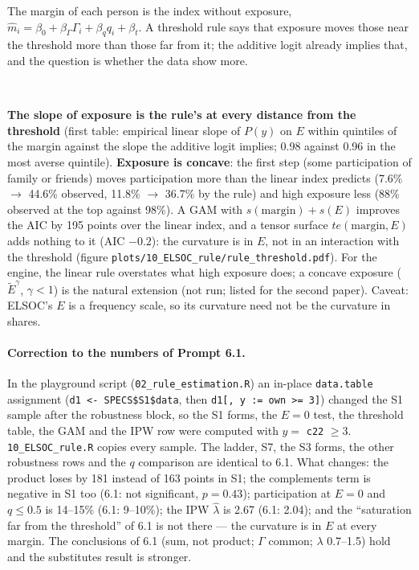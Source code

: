\documentclass[11pt,a4paper]{article}
\newcommand{\Ee}{\tilde{E}}                 %
\newcommand{\code}[1]{\texttt{#1}}
\begin{document}
The margin of each person is the index without exposure, $\hat m_i = \beta_0 + \beta_\Gamma\Gamma_i +
\beta_q q_i + \beta_t$. A threshold rule says that exposure moves those near the threshold more than those
far from it; the additive logit already implies that, and the question is whether the data show more.
\begin{center}
\footnotesize
\\[6pt]

\end{center}
\noindent \textbf{The slope of exposure is the rule's at every distance from the threshold} (first table:
empirical linear slope of $P(y)$ on $E$ within quintiles of the margin against the slope the additive logit
implies; 0.98 against 0.96 in the most averse quintile). \textbf{Exposure is concave}: the first step (some
participation of family or friends) moves participation more than the linear index predicts (7.6\% $\to$
44.6\% observed, 11.8\% $\to$ 36.7\% by the rule) and high exposure less (88\% observed at the top against
98\%). A GAM with $s(\text{margin}) + s(E)$ improves the AIC by 195 points over the linear index, and a
tensor surface $te(\text{margin}, E)$ adds nothing to it (AIC $-0.2$): the curvature is in $E$, not in an
interaction with the threshold (figure \code{plots/10\_ELSOC\_rule/rule\_threshold.pdf}). For the engine,
the linear rule overstates what high exposure does; a concave exposure ($\Ee^{\gamma}$, $\gamma < 1$) is the
natural extension (not run; listed for the second paper). Caveat: ELSOC's $E$ is a frequency scale, so its
curvature need not be the curvature in shares.

\paragraph{Correction to the numbers of Prompt 6.1.} In the playground script
(\code{02\_rule\_estimation.R}) an in-place \code{data.table} assignment
(\code{d1 <- SPECS\$S1\$data}, then \code{d1[, y := own >= 3]}) changed the S1 sample after the robustness block, so the
S1 forms, the $E = 0$ test, the threshold table, the GAM and the IPW row were computed with
$y = $ \code{c22} $\ge 3$. \code{10\_ELSOC\_rule.R} copies every sample. The ladder, S7, the S3 forms, the
other robustness rows and the $q$ comparison are identical to 6.1. What changes: the product loses by 181
instead of 163 points in S1; the complements term is negative in S1 too (6.1: not significant, $p = 0.43$);
participation at $E = 0$ and $q \le 0.5$ is 14--15\% (6.1: 9--10\%); the IPW $\hat\lambda$ is 2.67 (6.1:
2.04); and the ``saturation far from the threshold'' of 6.1 is not there --- the curvature is in $E$ at every
margin. The conclusions of 6.1 (sum, not product; $\Gamma$ common; $\lambda$ 0.7--1.5) hold and the
substitutes result is stronger.
\end{document}
